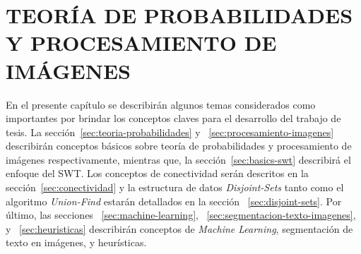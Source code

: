 \chapter{TEORÍA DE PROBABILIDADES Y PROCESAMIENTO DE IMÁGENES}
\label{cap:marcoteorico}
\setcounter{secnumdepth}{0}
  En el presente capítulo se describirán algunos temas considerados como 
  importantes por brindar los conceptos claves para el desarrollo del trabajo de 
  tesis. La sección~\ref{sec:teoria-probabilidades} y 
  ~\ref{sec:procesamiento-imagenes} describirán conceptos básicos sobre teoría de 
  probabilidades y procesamiento de imágenes respectivamente, mientras que, la
  sección~\ref{sec:basics-swt} describirá el enfoque del SWT. Los conceptos de 
  conectividad serán descritos en la sección~\ref{sec:conectividad} y la 
  estructura de datos \textit{Disjoint-Sets} tanto como el algoritmo 
  \textit{Union-Find} estarán detallados en la sección ~\ref{sec:disjoint-sets}.
  Por último, las secciones ~\ref{sec:machine-learning}, 
  ~\ref{sec:segmentacion-texto-imagenes}, y ~\ref{sec:heuristicas} describirán 
  conceptos de \textit{Machine Learning}, segmentación de texto en 
  imágenes, y heurísticas.
\setcounter{secnumdepth}{3}  
